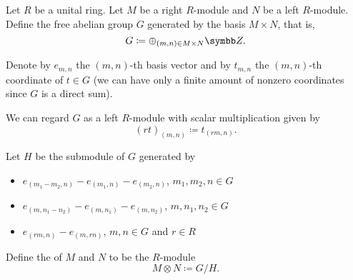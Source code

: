 \begin{definition}\label{def:module_tensor_product}\cite[574]{Knapp2016BAlg}
  Let \( R \) be a unital ring. Let \( M \) be a right \( R \)-module and \( N \) be a left \( R \)-module. Define the free abelian group \( G \) generated by the basis \( M \times N \), that is,
  \begin{equation*}
    G \coloneqq \oplus_{(m,n) \in M \times N} \Z.
  \end{equation*}

  Denote by \( e_{m,n} \) the \( (m,n) \)-th basis vector and by \( t_{m,n} \) the \( (m,n) \)-th coordinate of \( t \in G \) (we can have only a finite amount of nonzero coordinates since \( G \) is a direct sum).

  We can regard \( G \) as a left \( R \)-module with scalar multiplication given by
  \begin{equation*}
    (r t)_{(m,n)} \coloneqq t_{(rm,n)}.
  \end{equation*}

  Let \( H \) be the submodule of \( G \) generated by
  \begin{itemize}
    \item \( e_{(m_1 - m_2, n)} - e_{(m_1,n)} - e_{(m_2,n)} \), \( m_1, m_2, n \in G \)
    \item \( e_{(m, n_1 - n_2)} - e_{(m,n_1)} - e_{(m,n_2)} \), \( m, n_1, n_2 \in G \)
    \item \( e_{(rm,n)} - e_{(m,rn)} \), \( m, n \in G \) and \( r \in R \)
  \end{itemize}

  Define the  of \( M \) and \( N \) to be the \( R \)-module 
  \begin{equation*}
    M \otimes N \coloneqq G / H.
  \end{equation*}
\end{definition}

